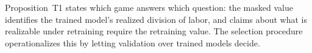 Proposition~T1 states which game answers which question: the masked
value identifies the trained model's realized division of labor, and
claims about what is realizable under retraining require the
retraining value. The selection procedure operationalizes this by
letting validation over trained models decide.
